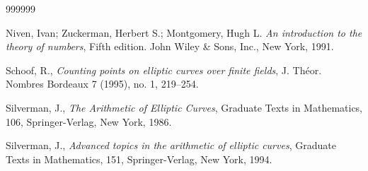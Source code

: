 \documentclass{amsart}
\theoremstyle{plain}
\begin{document}
\begin{thebibliography}{999999}

Niven, Ivan; Zuckerman, Herbert S.; Montgomery, Hugh L. 
{\it An introduction to the theory of numbers}, Fifth edition. 
John Wiley \& Sons, Inc., New York, 1991.

Schoof, R.,
{\it Counting points on elliptic curves over finite fields},
J. Th\'eor. Nombres Bordeaux 7 (1995), no. 1, 219--254.

Silverman, J., {\it The Arithmetic of Elliptic Curves}, 
Graduate Texts in Mathematics, 106, Springer-Verlag, New York, 1986.

Silverman, J.,
{\it Advanced topics in the arithmetic of elliptic curves}, 
Graduate Texts in Mathematics, 151, Springer-Verlag, New York, 1994.



\end{thebibliography}
\end{document}
